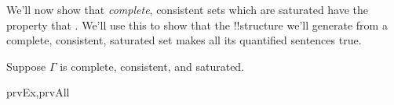 \documentclass[../../../include/open-logic-section]{subfiles}
\begin{document}
\begin{explain}
We'll now show that \emph{complete}, consistent sets which are
saturated have the property that . We'll use this to show that the !!{structure} we'll
generate from a complete, consistent, saturated set makes all its
quantified sentences true.
\end{explain}

\begin{prop}
Suppose $\Gamma$ is complete, consistent, and saturated.
\begin{tagenumerate}{prvEx,prvAll}
\end{tagenumerate}
\end{prop}
\end{document}
